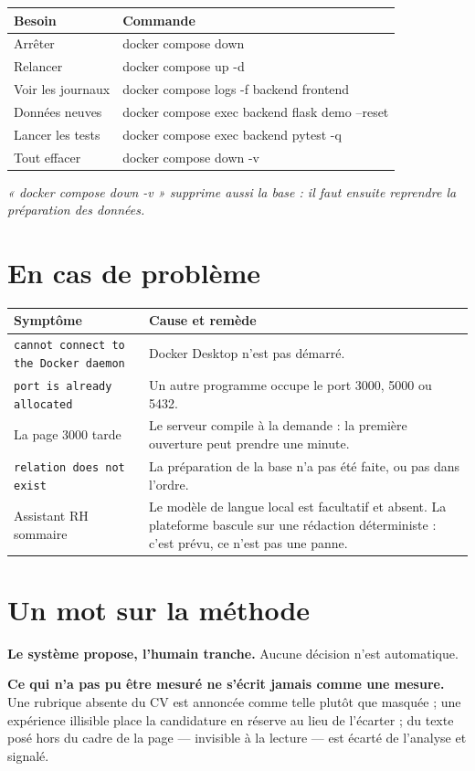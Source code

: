 \documentclass[11pt,a4paper]{article}
\begin{document}
\begin{center}
\begin{tabular}{@{}p{5.2cm}>{\ttfamily\small}p{9.4cm}@{}}
\toprule
\textbf{Besoin} & \textrm{\textbf{Commande}}\\
\midrule
Arrêter          & docker compose down\\
Relancer         & docker compose up -d\\
Voir les journaux& docker compose logs -f backend frontend\\
Données neuves   & docker compose exec backend flask demo --reset\\
Lancer les tests & docker compose exec backend pytest -q\\
Tout effacer     & docker compose down -v\\
\bottomrule
\end{tabular}
\end{center}

\noindent
\textcolor{gris}{\small\itshape
« docker compose down -v » supprime aussi la base : il faut ensuite reprendre
la préparation des données.}

\section{En cas de problème}

\begin{center}
\begin{tabular}{@{}p{5.6cm}p{9.0cm}@{}}
\toprule
\textbf{Symptôme} & \textbf{Cause et remède}\\
\midrule
\texttt{cannot connect to the Docker daemon}
 & Docker Desktop n'est pas démarré.\\
\texttt{port is already allocated}
 & Un autre programme occupe le port 3000, 5000 ou 5432.\\
La page 3000 tarde
 & Le serveur compile à la demande : la première ouverture peut prendre une minute.\\
\texttt{relation does not exist}
 & La préparation de la base n'a pas été faite, ou pas dans l'ordre.\\
Assistant RH sommaire
 & Le modèle de langue local est facultatif et absent. La plateforme bascule sur une rédaction déterministe : c'est prévu, ce n'est pas une panne.\\
\bottomrule
\end{tabular}
\end{center}

\section{Un mot sur la méthode}

\textbf{Le système propose, l'humain tranche.} Aucune décision n'est
automatique.

\medskip
\noindent
\textbf{Ce qui n'a pas pu être mesuré ne s'écrit jamais comme une mesure.}
Une rubrique absente du CV est annoncée comme telle plutôt que masquée ; une
expérience illisible place la candidature en réserve au lieu de l'écarter ;
du texte posé hors du cadre de la page --- invisible à la lecture --- est
écarté de l'analyse et signalé.
\end{document}
